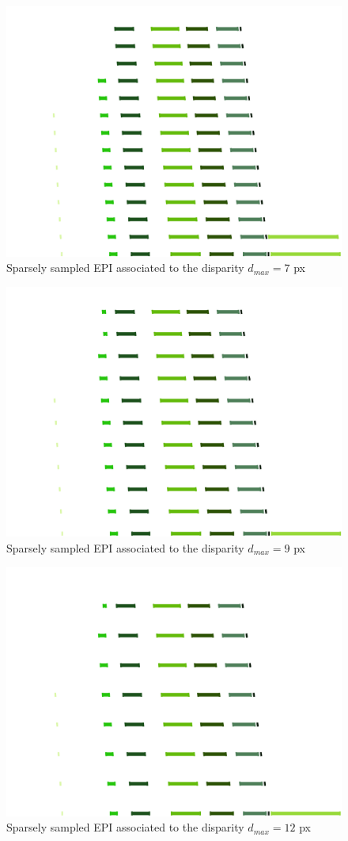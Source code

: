 \begin{itemize}
\begin{figure}[h!]
\centering
\includegraphics[width = 0.7 \textwidth]{./Diagrams/results/Disparity_benchmark/673_10_102_7_48_8_sparse.png}
\caption{Sparsely sampled EPI associated to the disparity $d_{max} = 7$ px}
\label{fig:second_sparse_disparity}
\end{figure}

\begin{figure}[h!]
\centering
\includegraphics[width = 0.7 \textwidth]{./Diagrams/results/Disparity_benchmark/673_10_102_9_48_8_sparse.png}
\caption{Sparsely sampled EPI associated to the disparity $d_{max}=9$ px}
\label{fig:third_sparse_disparity}
\end{figure}

\begin{figure}[h!]
\centering
\includegraphics[width = 0.7 \textwidth]{./Diagrams/results/Disparity_benchmark/673_10_102_12_48_8_sparse.png}
\caption{Sparsely sampled EPI associated to the disparity $d_{max}=12$ px}
\label{fig:fourth_lines_disparity}
\end{figure}


\end{itemize}
